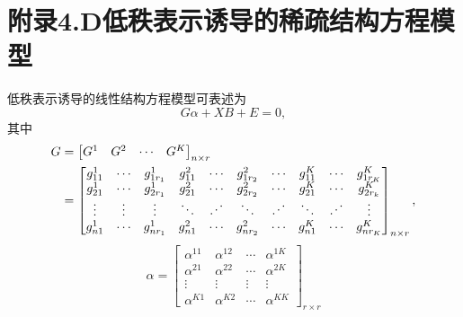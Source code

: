 \section*{附录4.D\quad 低秩表示诱导的稀疏结构方程模型}

低秩表示诱导的线性结构方程模型可表述为
\begin{equation}
G\alpha+XB+E=0,\tag{4.D.1}
\end{equation}
其中
\[
\begin{aligned}
G&=\begin{bmatrix}G^1&G^2&\cdots&G^K\end{bmatrix}_{n\times r}\\
&=\begin{bmatrix}
g_{11}^1&\cdots&g_{1r_1}^1&g_{11}^2&\cdots&g_{1r_2}^2&\cdots&g_{11}^K&\cdots&g_{1r_K}^K\\
g_{21}^1&\cdots&g_{2r_1}^1&g_{21}^2&\cdots&g_{2r_2}^2&\cdots&g_{21}^K&\cdots&g_{2r_k}^K\\
\vdots&\vdots&\vdots&\ddots&\chFourBIddots&\ddots&\chFourBIddots&\ddots&\chFourBIddots&\vdots\\
g_{n1}^1&\cdots&g_{nr_1}^1&g_{n1}^2&\cdots&g_{nr_2}^2&\cdots&g_{n1}^K&\cdots&g_{nr_K}^K
\end{bmatrix}_{n\times r},
\end{aligned}
\]
\[
\alpha=\begin{bmatrix}
\alpha^{11}&\alpha^{12}&\cdots&\alpha^{1K}\\
\alpha^{21}&\alpha^{22}&\cdots&\alpha^{2K}\\
\vdots&\vdots&\vdots&\vdots\\
\alpha^{K1}&\alpha^{K2}&\cdots&\alpha^{KK}
\end{bmatrix}_{r\times r}
\]
\begingroup\small\setlength{\arraycolsep}{2pt}
